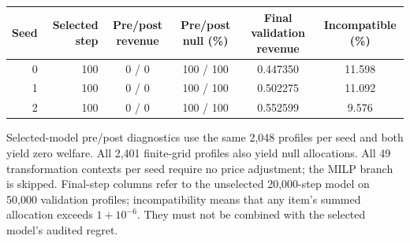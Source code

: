 \begin{table}[!t]
\centering\footnotesize
{}
\label{tab:gemnet-diagnostic}
\setlength{\tabcolsep}{4pt}
\begin{tabular}{rrcccc}
\toprule
Seed & Selected step & Pre/post revenue & Pre/post null (\%) & Final validation revenue & Incompatible (\%) \\
\midrule
0 & 100 & 0 / 0 & 100 / 100 & 0.447350 & 11.598 \\
1 & 100 & 0 / 0 & 100 / 100 & 0.502275 & 11.092 \\
2 & 100 & 0 / 0 & 100 / 100 & 0.552599 & 9.576 \\
\bottomrule
\end{tabular}
\par\smallskip\begin{minipage}{0.98\textwidth}\footnotesize Selected-model pre/post diagnostics use the same 2,048 profiles per seed and both yield zero welfare. All 2,401 finite-grid profiles also yield null allocations. All 49 transformation contexts per seed require no price adjustment; the MILP branch is skipped. Final-step columns refer to the unselected 20,000-step model on 50,000 validation profiles; incompatibility means that any item's summed allocation exceeds $1+10^{-6}$. They must not be combined with the selected model's audited regret.\end{minipage}
\end{table}
